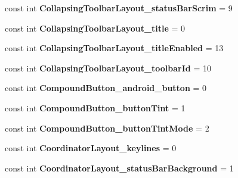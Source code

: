\begin{DoxyCompactItemize}
const int {\bfseries Collapsing\+Toolbar\+Layout\+\_\+status\+Bar\+Scrim} = 9
\item 
\mbox{\label{class_pinned_app_1_1_droid_1_1_resource_1_1_styleable_a07698117f9bcc013d2753533695f4d33}} 
const int {\bfseries Collapsing\+Toolbar\+Layout\+\_\+title} = 0
\item 
\mbox{\label{class_pinned_app_1_1_droid_1_1_resource_1_1_styleable_aedcc829ddfa39f30d1a962e04db12376}} 
const int {\bfseries Collapsing\+Toolbar\+Layout\+\_\+title\+Enabled} = 13
\item 
\mbox{\label{class_pinned_app_1_1_droid_1_1_resource_1_1_styleable_adf5d02fcd9531ae802bc093f8c35e317}} 
const int {\bfseries Collapsing\+Toolbar\+Layout\+\_\+toolbar\+Id} = 10
\item 
\mbox{\label{class_pinned_app_1_1_droid_1_1_resource_1_1_styleable_a567e3909ad9a6c4e9ecd06582192c983}} 
const int {\bfseries Compound\+Button\+\_\+android\+\_\+button} = 0
\item 
\mbox{\label{class_pinned_app_1_1_droid_1_1_resource_1_1_styleable_a59f905ab4c7e19fddf9ec4c40c82cf36}} 
const int {\bfseries Compound\+Button\+\_\+button\+Tint} = 1
\item 
\mbox{\label{class_pinned_app_1_1_droid_1_1_resource_1_1_styleable_ae4ac3731da3f698c6a81a219b5c7a762}} 
const int {\bfseries Compound\+Button\+\_\+button\+Tint\+Mode} = 2
\item 
\mbox{\label{class_pinned_app_1_1_droid_1_1_resource_1_1_styleable_a48470cf7a43f874a6e44ca275025237d}} 
const int {\bfseries Coordinator\+Layout\+\_\+keylines} = 0
\item 
\mbox{\label{class_pinned_app_1_1_droid_1_1_resource_1_1_styleable_a12571d10b07ddaab3fe25ac0941ff2d7}} 
const int {\bfseries Coordinator\+Layout\+\_\+status\+Bar\+Background} = 1

\end{DoxyCompactItemize}
